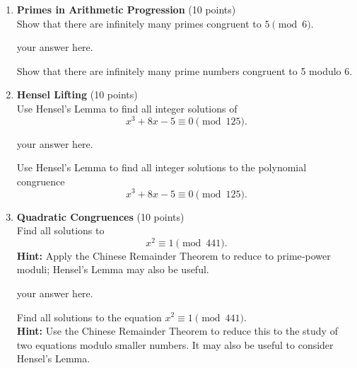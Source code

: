 \begin{enumerate}
  \item \textbf{Primes in Arithmetic Progression} (10 points)\\
  Show that there are infinitely many primes congruent to \(5\pmod6\).
  \begin{subanswer}
    your answer here.
  \end{subanswer}
  Show that there are infinitely many prime numbers congruent to 5 modulo 6.


  \item \textbf{Hensel Lifting} (10 points)\\
  Use Hensel’s Lemma to find all integer solutions of
  \[
    x^3 + 8x - 5 \equiv 0 \pmod{125}.
  \]
  \begin{subanswer}
    your answer here.
  \end{subanswer}
  Use Hensel's Lemma to find all integer solutions to the polynomial congruence
$$
x^3 + 8x - 5 \equiv 0 \pmod{125}.
$$


  \item \textbf{Quadratic Congruences} (10 points)\\
  Find all solutions to
  \[
    x^2 \equiv 1 \pmod{441}.
  \]
  \textbf{Hint:} Apply the Chinese Remainder Theorem to 
  reduce to prime‑power moduli; Hensel’s Lemma may also be useful.
  \begin{subanswer}
    your answer here.
  \end{subanswer}
  Find all solutions to the equation $x^2 \equiv 1 \pmod{441}$.\\
  \textbf{Hint:} Use the Chinese Remainder Theorem to reduce this to the study of two equations modulo smaller numbers. It may also be useful to consider Hensel's Lemma.


  





\end{enumerate}
